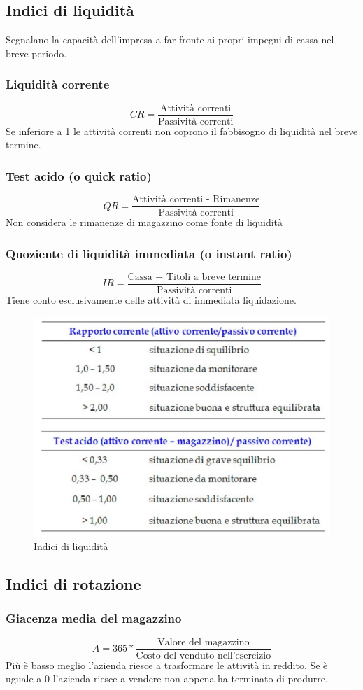 \documentclass{report}
\begin{document}
	\subsection{Indici di liquidità}
	Segnalano la capacità dell'impresa a far fronte ai propri impegni di cassa nel breve periodo.
	\subsubsection{Liquidità corrente}
	\[CR = \frac{\text{Attività correnti}}{\text{Passività correnti}}\]
	Se inferiore a 1 le attività correnti non coprono il fabbisogno di liquidità nel breve termine.
	\subsubsection{Test acido (o quick ratio)}
	\[QR = \frac{\text{Attività correnti - Rimanenze}}{\text{Passività correnti}}\]
	Non considera le rimanenze di magazzino come fonte di liquidità
	\subsubsection{Quoziente di liquidità immediata (o instant ratio)}
	\[IR = \frac{\text{Cassa + Titoli a breve termine}}{\text{Passività correnti}}\]
	Tiene conto esclusivamente delle attività di immediata liquidazione.
	\begin{figure}[h]
		\centering
		\includegraphics[width=0.7\linewidth]{indici-liquidita}
		\caption{Indici di liquidità}
		\label{fig:indici-liquidita}
	\end{figure}
	\subsection{Indici di rotazione}
	\subsubsection{Giacenza media del magazzino}
	\[A = 365 * \frac{\text{Valore del magazzino}}{\text{Costo del venduto nell'esercizio}}\]
	Più è basso meglio l'azienda riesce a trasformare le attività in reddito. Se è uguale a 0 l'azienda riesce a vendere non appena ha terminato di produrre.
\end{document}
